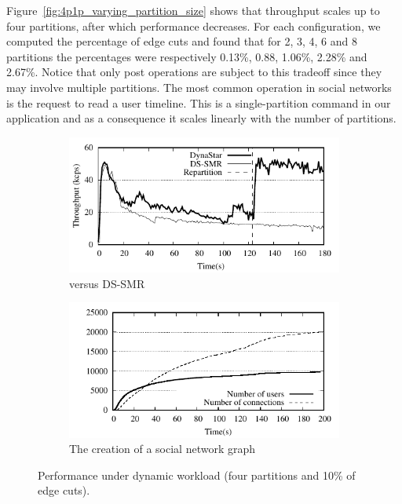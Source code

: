 Figure~\ref{fig:4p1p_varying_partition_size} shows that \dynastar throughput scales up to four partitions, after which performance decreases.
For each configuration, we computed the percentage of edge cuts and found that for 2, 3, 4, 6 and 8 partitions the percentages were respectively 
0.13\%, 0.88, 1.06\%, 2.28\% and 2.67\%.
Notice that only post operations are subject to this tradeoff since they may involve multiple partitions.
The most common operation in social networks is the request to read a user timeline. This is a single-partition
command in our application and as a consequence it scales linearly with the number of partitions.


\begin{figure}[h!]
  \centering
  \begin{subfigure}[b]{0.45\textwidth}
    \centering
    \includegraphics[width=0.95\columnwidth]{figures/socc/socc-dynamicload-tp}
    \caption{\dynastar versus DS-SMR}
  \end{subfigure}
  \begin{subfigure}[b]{0.45\textwidth}
    \centering
    \includegraphics[width=0.95\columnwidth]{figures/socc/socc-dynamicload-graph}
    \caption{The creation of a social network graph}
  \end{subfigure}
    \caption{Performance under dynamic workload (four partitions and 10\% of edge cuts).}
	\label{fig:dynamic_load_tput}
\end{figure}

